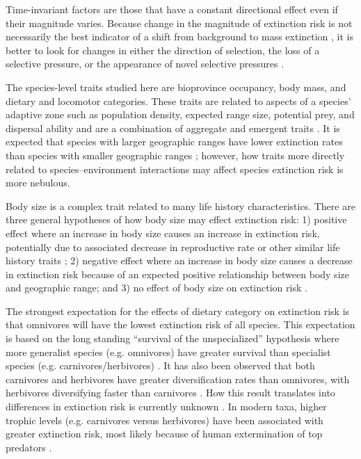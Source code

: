 Time-invariant factors are those that have a constant directional effect even if their magnitude varies. Because change in the magnitude of extinction risk is not necessarily the best indicator of a shift from background to mass extinction \cite{Wang2003}, it is better to look for changes in either the direction of selection, the loss of a selective pressure, or the appearance of novel selective pressures \cite{Jablonski1986}.

The species-level traits studied here are bioprovince occupancy, body mass, and dietary and locomotor categories. These traits are related to aspects of a species' adaptive zone such as population density, expected range size, potential prey, and dispersal ability \cite{Smith2004,Jernvall2004} and are a combination of aggregate and emergent traits \cite{Jablonski2008a}. It is expected that species with larger geographic ranges have lower extinction rates than species with smaller geographic ranges \cite{Jablonski1986,Roy2009c}; however, how traits more directly related to species--environment interactions may affect species extinction risk is more nebulous.

Body size is a complex trait related to many life history characteristics. There are three general hypotheses of how body size may effect extinction risk: 1) positive effect where an increase in body size causes an increase in extinction risk, potentially due to associated decrease in reproductive rate or other similar life history traits \cite{Liow2008,Liow2009}; 2) negative effect where an increase in body size causes a decrease in extinction risk because of an expected positive relationship between body size and geographic range; and 3) no effect of body size on extinction risk \cite{Tomiya2013}. 

The strongest expectation for the effects of dietary category on extinction risk is that omnivores will have the lowest extinction risk of all species. This expectation is based on the long standing ``survival of the unspecialized'' hypothesis where more generalist species (e.g. omnivores) have greater survival than specialist species (e.g. carnivores/herbivores) \cite{Simpson1944,Liow2004a}. It has also been observed that both carnivores and herbivores have greater diversification rates than omnivores, with herbivores diversifying faster than carnivores \cite{Price2012}. How this result translates into differences in extinction risk is currently unknown \cite{Rabosky2010a}. In modern taxa, higher trophic levels (e.g. carnivores versus herbivores) have been associated with greater extinction risk, most likely because of human extermination of top predators \cite{Liow2009,Purvis2000a}. 

